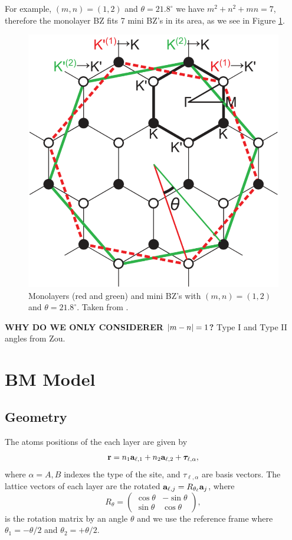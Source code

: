 \documentclass[a4paper,12pt]{report}
\begin{document}
\n

For example, $(m,n) = (1,2)$ and $\theta = 21.8^\circ$ we have $m^2 + n^2 + mn = 7$, therefore the monolayer BZ fits 7 mini BZ's in its area, as we see in Figure \ref{fig:bzminibz}.
\begin{figure}[H]
\centering
\includegraphics[width=0.5\linewidth]{fig/bzminibz.png}
\caption{Monolayers (red and green) and mini BZ's with $(m,n) = (1,2)$ and $\theta = 21.8^\circ$. Taken from \cite{koshino2012}.}
\label{fig:bzminibz}
\end{figure}

\n

\textbf{WHY DO WE ONLY CONSIDERER $\abs{m-n} = 1$?} Type I and Type II angles from Zou.

\pagebreak

\section{BM Model}

\subsection{Geometry}

The atoms positions of the each layer are given by
\begin{equation} \label{eq:position-atoms-tbg}
{\vb{r}} = n_1 {\vb{a}}_{\ell,1} + n_2 {\vb{a}}_{\ell,2} + {\bm{\tau}}_{\ell,\alpha},
\end{equation}
where $\alpha = A,B$ indexes the type of the site, and $\tau_{\ell,\alpha}$ are basis vectors. The lattice vectors of each layer are the rotated ${\vb{a}}_{\ell,j} = R_{\theta_\ell} {\vb{a}}_{j}$, where
\begin{equation} \label{eq:rotation-matrix}
R_\theta =
\begin{pmatrix}
\cos\theta & -\sin\theta \\
\sin\theta & \cos\theta
\end{pmatrix},
\end{equation}
is the rotation matrix by an angle $\theta$ and we use the reference frame where $\theta_1 = -\theta/2$ and $\theta_2 = +\theta/2$.
\end{document}
